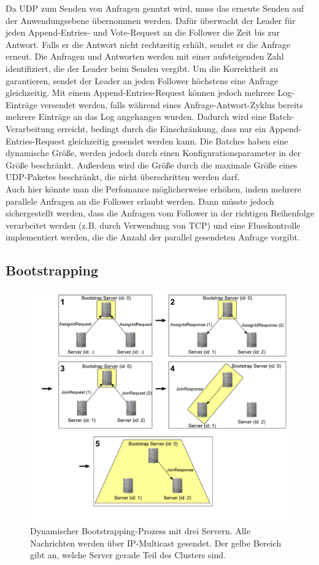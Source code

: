 Da UDP zum Senden von Anfragen genutzt wird, muss das erneute Senden auf der Anwendungsebene übernommen werden. Dafür überwacht der Leader für jeden Append-Entries- und Vote-Request an die Follower die Zeit bis zur Antwort. Falls er die Antwort nicht rechtzeitig erhält, sendet er die Anfrage erneut. Die Anfragen und Antworten werden mit einer aufsteigenden Zahl identifiziert, die der Leader beim Senden vergibt. Um die Korrektheit zu garantieren, sendet der Leader an jeden Follower höchstens eine Anfrage gleichzeitig. Mit einem Append-Entries-Request können jedoch mehrere Log-Einträge versendet werden, falls während eines Anfrage-Antwort-Zyklus bereits mehrere Einträge an das Log angehangen wurden. Dadurch wird eine Batch-Verarbeitung erreicht, bedingt durch die Einschränkung, dass nur ein Append-Entries-Request gleichzeitig gesendet werden kann. Die Batches haben eine dynamische Größe, werden jedoch durch einen Konfigurationsparameter in der Größe beschränkt. Außerdem wird die Größe durch die maximale Größe eines UDP-Paketes beschränkt, die nicht überschritten werden darf.\\
Auch hier könnte man die Perfomance möglicherweise erhöhen, indem mehrere parallele Anfragen an die Follower erlaubt werden. Dann müsste jedoch sichergestellt werden, dass die Anfragen vom Follower in der richtigen Reihenfolge verarbeitet werden (z.B. durch Verwendung von TCP) und eine Flusskontrolle implementiert werden, die die Anzahl der parallel gesendeten Anfrage vorgibt.

\subsection{Bootstrapping}

\begin{figure}[p]
	\centering
	\includegraphics[width=\linewidth]{img/bootstrap.pdf}
	\caption{Dynamischer Bootstrapping-Prozess mit drei Servern. Alle Nachrichten werden über IP-Multicast gesendet. Der gelbe Bereich gibt an, welche Server gerade Teil des Clusters sind.}
	\label{fig:bootstrap}
\end{figure}


